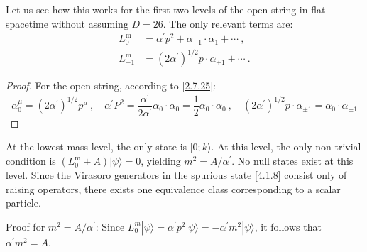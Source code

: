 Let us see how this works for the first two levels of the open string in flat spacetime without assuming $D=26$. The only relevant terms are:
\begin{subequations} \label{4.1.11}
	\begin{align}
		L_{0}^{\mathrm{m}}&=\alpha^{\prime} p^{2}+\alpha_{-1} \cdot \alpha_{1}+\cdots \:, \label{4.1.11a} \\
		L_{\pm 1}^{\mathrm{m}}&= (2 \alpha^{\prime})^{1 / 2} p \cdot \alpha_{\pm 1}+\cdots \:. \label{4.1.11b}
	\end{align}
\end{subequations}
\begin{tcolorbox}
	\begin{proof} For the open string, according to \eqref{2.7.25}:
		\[
		\alpha_{0}^{\mu}=(2 \alpha^{\prime})^{1 / 2} p^{\mu} \:,\quad 
		\alpha^{\prime} P^{2}=\frac{\alpha^{\prime}}{2 \alpha^{\prime}} \alpha_{0} \cdot \alpha_{0}=\frac{1}{2} \alpha_{0} \cdot \alpha_{0} \:, \quad 
		(2 \alpha^{\prime})^{1 / 2} p \cdot \alpha_{\pm 1}=\alpha_{0} \cdot \alpha_{\pm 1}
		\]
	\end{proof}
\end{tcolorbox}

At the lowest mass level, the only state is $\lvert 0 ; k \rangle $. At this level, the only non-trivial condition is $(L_{0}^{\mathrm{m}}+A)|\psi\rangle=0$, yielding $m^{2}=A / \alpha^{\prime}$. No null states exist at this level. Since the Virasoro generators in the spurious state \eqref{4.1.8} consist only of raising operators, there exists one equivalence class corresponding to a scalar particle.
\begin{tcolorbox}
	\begin{remark}
		Proof for $m^{2}=A / \alpha^{\prime} $: Since $L_{0}^{m}|\psi\rangle=\alpha^{\prime} p^{2} \lvert \psi\rangle=-\alpha^{\prime} m^{2}|\psi\rangle$, it follows that $\alpha^{\prime} m^{2}=A$.
	\end{remark}
\end{tcolorbox}

